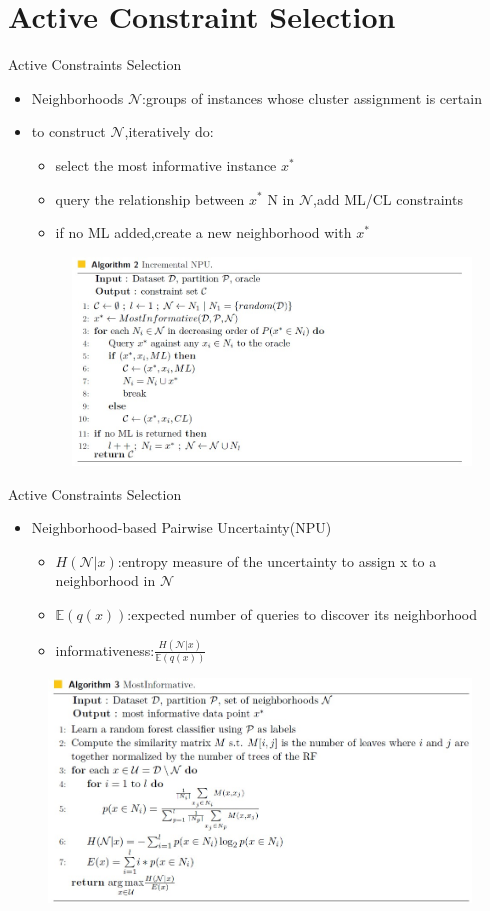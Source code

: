 \documentclass{beamer}
\begin{document}
\section{Active Constraint Selection}
\begin{frame}{Active Constraints Selection}
    \begin{itemize}
        \item Neighborhoods $\mathcal{N}$:groups
        of instances whose cluster assignment is certain
        \item 
    to construct $\mathcal{N}$,iteratively do:
    \begin{itemize}
        \item select the most informative instance $x^*$
        \item query the relationship between $x^*$ N in $\mathcal{N}$,add ML/CL constraints
        \item if no ML added,create a new neighborhood with $x^*$
    \end{itemize}
    \begin{figure}
        \centering
        \includegraphics[width=0.6\linewidth]{./images/npu.jpg}
    \end{figure}
\end{itemize}
\end{frame}

\begin{frame}{Active Constraints Selection}
    \begin{itemize}
        \item Neighborhood-based Pairwise Uncertainty(NPU)
        \begin{itemize}
        \item $H(\mathcal{N}|x)$:entropy measure of
        the uncertainty to assign x to a neighborhood in $\mathcal{N}$
        \item $\mathbb{E}(q(x))$:expected number of queries to discover its neighborhood
        \item informativeness:$\frac{H(\mathcal{N}|x)}{\mathbb{E}(q(x))}$
        \end{itemize}
    \end{itemize}
    \begin{figure}
        \centering
        \includegraphics[width=0.6\linewidth]{./images/inform.jpg}
    \end{figure}
\end{frame}
\end{document}
